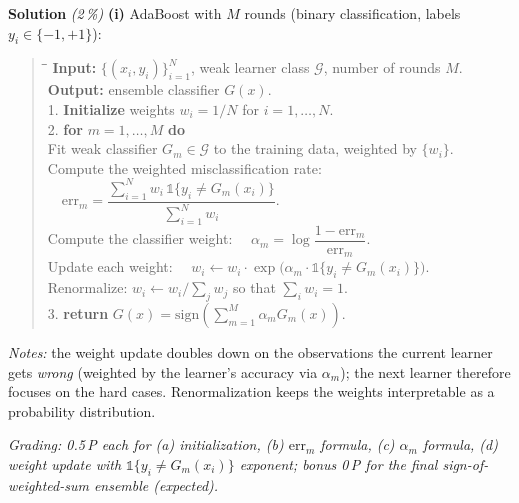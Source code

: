 \documentclass[11pt,a4paper]{article}
\newcommand{\subpoints}[1]{\textit{(#1\,\%)}}
\newcommand{\sol}{\noindent\textbf{Solution}}
\begin{document}
\sol{} \subpoints{2} \textbf{(i)} AdaBoost with $M$ rounds (binary classification, labels
$y_i\in\{-1,+1\}$):
\begin{quote}\small
\begin{tabbing}
\hspace{1.5em}\=\hspace{1.5em}\=\kill
\textbf{Input:} $\{(x_i, y_i)\}_{i=1}^N$, weak learner class $\mathcal G$, number of rounds $M$.\\
\textbf{Output:} ensemble classifier $G(x)$.\\[2pt]
1. \textbf{Initialize} weights $w_i = 1/N$ for $i = 1, \ldots, N$.\\
2. \textbf{for} $m = 1, \ldots, M$ \textbf{do}\\
 Fit weak classifier $G_m \in \mathcal G$ to the training data, weighted by $\{w_i\}$.\\
 Compute the weighted misclassification rate:
   $\quad\mathrm{err}_m = \dfrac{\sum_{i=1}^N w_i\,\mathbb{1}\{y_i \neq G_m(x_i)\}}{\sum_{i=1}^N w_i}$.\\
 Compute the classifier weight:
   $\quad\alpha_m = \log\!\dfrac{1 - \mathrm{err}_m}{\mathrm{err}_m}$.\\
 Update each weight:
   $\quad w_i \leftarrow w_i \cdot \exp\!\bigl(\alpha_m \cdot \mathbb{1}\{y_i \neq G_m(x_i)\}\bigr)$.\\
 Renormalize: $w_i \leftarrow w_i / \sum_{j} w_j$ so that $\sum_i w_i = 1$.\\
3. \textbf{return} $G(x) = \mathrm{sign}\!\left(\sum_{m=1}^M \alpha_m G_m(x)\right)$.
\end{tabbing}
\end{quote}
\emph{Notes:} the weight update doubles down on the observations the current learner gets
\emph{wrong} (weighted by the learner's accuracy via $\alpha_m$); the next learner therefore
focuses on the hard cases. Renormalization keeps the weights interpretable as a probability
distribution.

\noindent\emph{Grading: 0.5\,P each for (a) initialization, (b) $\mathrm{err}_m$ formula, (c)
$\alpha_m$ formula, (d) weight update with $\mathbb{1}\{y_i\neq G_m(x_i)\}$ exponent; bonus 0\,P
for the final sign-of-weighted-sum ensemble (expected).}
\end{document}
